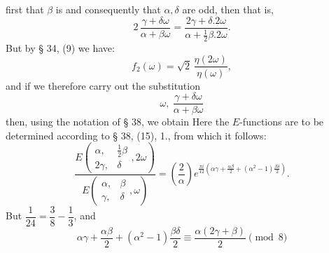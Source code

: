 first that $\beta$ is  and consequently that $\alpha, \delta$ are odd, then
that is,
\[
2\,\frac{\gamma+\delta\omega}{\alpha+\beta\omega} = \frac{2\gamma+\delta.2\omega}{\alpha+\frac{1}{2}\beta.2\omega}.
\]
But by § 34, (9) we have:
\[
f_2(\omega) = \sqrt{2}\,\frac{\eta(2\omega)}{\eta(\omega)},
\]
and if we therefore carry out the substitution
\[
\omega,\ \frac{\gamma+\delta\omega}{\alpha+\beta\omega}
\]
then, using the notation of § 38, we obtain
Here the $E$-functions are to be determined according to § 38, (15), 1., from which it follows:
\[
\frac{E\!\left(\begin{smallmatrix}\alpha, & \frac{1}{2}\beta\\ 2\gamma, & \delta\end{smallmatrix}, 2\omega\right)}{E\!\left(\begin{smallmatrix}\alpha, & \beta\\ \gamma, & \delta\end{smallmatrix}, \omega\right)}
= \left(\frac{2}{\alpha}\right) e^{\frac{\pi i}{12}\left(\alpha\gamma + \frac{\alpha\beta}{2} + (\alpha^2-1)\frac{\beta\delta}{2}\right)}.
\]
But $\dfrac{1}{24} = \dfrac{3}{8} - \dfrac{1}{3}$, and
\[
\alpha\gamma + \frac{\alpha\beta}{2} + (\alpha^2-1)\frac{\beta\delta}{2} \equiv \frac{\alpha(2\gamma+\beta)}{2} \pmod{8}
\]
